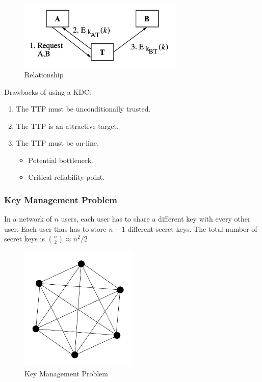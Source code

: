 \documentclass[12pt,titlepage]{article}
\begin{document}
\begin{center}
	\begin{figure}[h!]
		\centering
		\includegraphics[width=0.7\textwidth]{Trusted_Third_Party.png}
		\caption{Relationship}
	\end{figure}
\end{center}

Drawbacks of using a KDC: \begin{enumerate}
	\item The TTP must be unconditionally trusted.
	\item The TTP is an attractive target.
	\item The TTP must be on-line.\begin{itemize}
		\item Potential bottleneck.
		\item Critical reliability point.
	\end{itemize}
\end{enumerate}

\subsubsection{Key Management Problem}
In a network of $n$ users, each user has to share a different key with every other user. Each user thus has to store $n - 1$ different secret keys. The total number of secret keys is ${n \choose 2} \approx n^2 /2$

\begin{center}
	\begin{figure}[h!]
		\centering
		\includegraphics[width=0.5\textwidth]{Key_Management_Problem.png}
		\caption{Key Management Problem}
	\end{figure}
\end{center}
\end{document}
